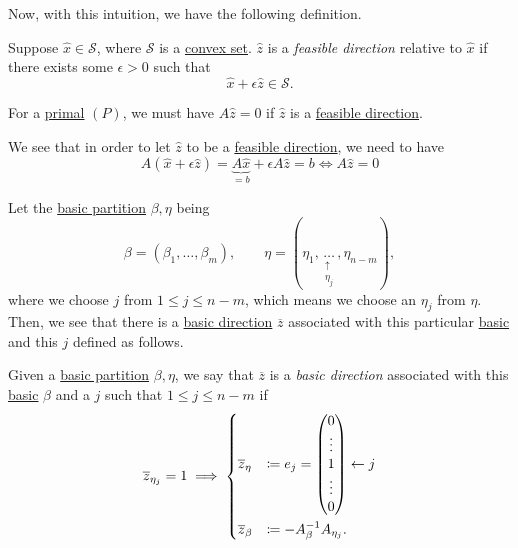 Now, with this intuition, we have the following definition.
\begin{definition}\label{def:feasible-direction}
	Suppose \(\hat{x}\in \mathcal{S}\), where \(\mathcal{S}\) is a \hyperref[def:convex-set]{convex set}.
	\(\hat{z}\) is a \emph{feasible direction} relative to \(\hat{x}\) if there exists some \(\epsilon>0\) such that
	\[
		\hat{x}+\epsilon \hat{z} \in \mathcal{S}.
	\]
	\begin{figure}[H]
		\centering
		\label{fig:feasible-direction}
	\end{figure}
\end{definition}

\begin{remark}
	For a \hyperref[def:primal]{primal} \((P)\), we must have \(A \hat{z} = 0\) if \(\hat{z}\) is a \hyperref[def:feasible-direction]{feasible direction}.
\end{remark}
\begin{explanation}
	We see that in order to let \(\hat{z}\) to be a \hyperref[def:feasible-direction]{feasible direction}, we need to have
	\[
		A(\hat{x} + \epsilon \hat{z}) = \underbrace{A \hat{x}}_{=b} + \epsilon A \hat{z} = b \iff A \hat{z} = 0
	\]
\end{explanation}

Let the \hyperref[def:basic-partition]{basic partition} \(\beta, \eta\) being
\[
	\beta = (\beta_1, \ldots , \beta_m), \qquad \eta = (\eta_1, \underset{\substack{\uparrow \\ \eta_j}}{\ldots} , \eta_{n-m}),
\]
where we choose \(j\) from \(1\leq j \leq n-m\), which means we choose an \(\eta_j\) from \(\eta\). Then, we see that there is a \hyperref[def:basic-direction]{basic direction}
\(\overline{z}\) associated with this particular \hyperref[def:basic]{basic} and this \(j\) defined as follows.

\begin{definition}\label{def:basic-direction}
	Given a \hyperref[def:basic-partition]{basic partition} \(\beta, \eta\), we say that \(\overline{z}\) is a \emph{basic direction} associated with this \hyperref[def:basic]{basic} \(\beta\)
	and a \(j\) such that \(1 \leq j \leq n-m\) if
	\[
		\overline{z}_{\eta_j} = 1 \implies \begin{dcases}
			\overline{z}_{\eta}  & \coloneqq e_j = \begin{pmatrix}
				                                       0      \\
				                                       \vdots \\
				                                       1      \\
				                                       \vdots \\
				                                       0      \\
			                                       \end{pmatrix}\leftarrow j \\
			\overline{z}_{\beta} & \coloneqq -A^{-1}_{\beta}A_{\eta_j}.
		\end{dcases}
	\]
\end{definition}

